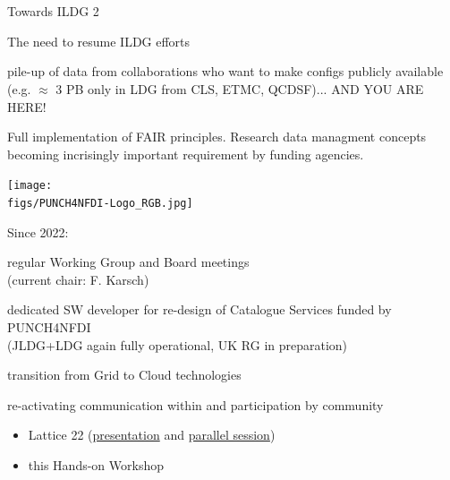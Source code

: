 \documentclass[aspectratio=169,xcolor=dvipsnames]{beamer}
\def\Darrow{\ding{220}}
\newcommand{\bi}{\begin{itemize}}
\newcommand{\ei}{\end{itemize}}
\def\figs{figs1}
\begin{document}
\section{}
\begin{frame}{Towards ILDG 2}

The need to resume ILDG efforts
  \begin{dinglist}{52}
     \item pile-up of data from collaborations who want to make configs publicly available\\
     (e.g. $\approx$ 3 PB only in LDG from CLS, ETMC, QCDSF)... \alert{AND YOU ARE HERE!}
     \item Full implementation of FAIR principles. Research data managment concepts becoming incrisingly important requirement by funding agencies.

  \end{dinglist}

  \hfill  \texttt{[image: \\figs/PUNCH4NFDI-Logo\_RGB.jpg]}

  \vspace*{-10mm}
  Since 2022:
  \begin{dinglist}{52}
  \item regular Working Group and Board meetings \\
    (current chair: F. Karsch)
  \item dedicated SW developer for re-design of Catalogue Services funded by PUNCH4NFDI\\
    (JLDG+LDG again fully operational, UK RG in preparation)
  \item transition from Grid to Cloud technologies
  \item re-activating communication within and participation by community
    \bi
    \item[\Darrow] Lattice 22 (\href{https://arxiv.org/pdf/2212.08392}{presentation} and
    \href{https://arxiv.org/pdf/2212.10138}{parallel session})
    \item[\Darrow] this Hands-on Workshop
    \ei
  \end{dinglist}
  \vfill
\end{frame}
\end{document}

